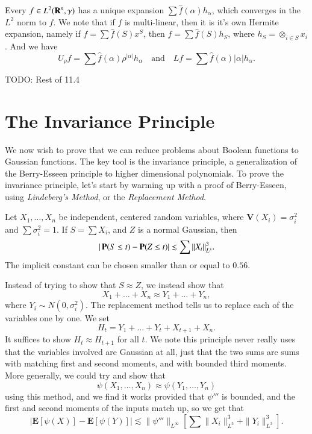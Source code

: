 Every $f \in L^2(\operatorname{\mathbf{R}}^n,\gamma)$ has a unique expansion $\sum \widehat{f}(\alpha) h_\alpha$, which converges in the $L^2$ norm to $f$. We note that if $f $ is multi-linear, then it is it's own Hermite expansion, namely if $f = \sum \widehat{f}(S) x^S$, then $f = \sum \widehat{f}(S) h_S$, where $h_S = \otimes_{i \in S} x_i$. And we have
%
\[ U_\rho f = \sum \widehat{f}(\alpha) \rho^{|\alpha|} h_\alpha \quad\text{and}\quad L f = \sum \widehat{f}(\alpha) |\alpha| h_\alpha. \]

TODO: Rest of 11.4

\section{The Invariance Principle}

We now wish to prove that we can reduce problems about Boolean functions to Gaussian functions. The key tool is the invariance principle, a generalization of the Berry-Esseen principle to higher dimensional polynomials. To prove the invariance principle, let's start by warming up with a proof of Berry-Esseen, using \emph{Lindeberg's Method}, or the \emph{Replacement Method}.

\begin{theorem}
    Let $X_1,\dots,X_n$ be independent, centered random variables, where $\mathbf{V}(X_i) = \sigma_i^2$ and $\sum \sigma_i^2 = 1$. If $S = \sum X_i$, and $Z$ is a normal Gaussian, then
    \[ |\operatorname{\mathbf{P}}(S \leq t) - \operatorname{\mathbf{P}}(Z \leq t)| \lesssim \sum \| X_i \|_{L^3}^3. \]
    The implicit constant can be chosen smaller than or equal to $0.56$.
\end{theorem}

Instead of trying to show that $S \approx Z$, we instead show that
%
\[ X_1 + \dots + X_n \approx Y_1 + \dots + Y_n, \]
%
where $Y_i \sim N(0,\sigma_i^2)$. The replacement method tells us to replace each of the variables one by one. We set
%
\[ H_t = Y_1 + \dots + Y_t + X_{t+1} + X_n. \]
%
It suffices to show $H_t \approx H_{t+1}$ for all $t$. We note this principle never really uses that the variables involved are Gaussian at all, just that the two sums are sums with matching first and second moments, and with bounded third moments. More generally, we could try and show that
%
\[ \psi(X_1,\dots,X_n) \approx \psi(Y_1,\dots,Y_n) \]
%
using this method, and we find it works provided that $\psi'''$ is bounded, and the first and second moments of the inputs match up, so we get that
%
\[ |\mathbf{E}[\psi(X)] - \mathbf{E}[\psi(Y)]| \lesssim \| \psi'''\|_{L^\infty} [\sum \| X_i \|_{L^3}^3 + \| Y_i \|_{L^3}^3]. \]

